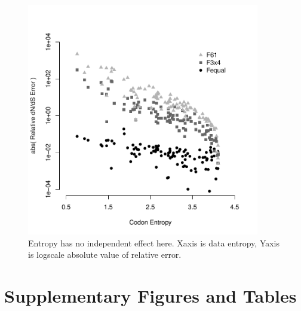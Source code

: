 \documentclass[11pt]{article}
\begin{document}
\bigskip
\begin{figure}[H]
\centerline{\includegraphics[width=4in]{figures/entropy_error_nobias.pdf}}
\caption{\label{entropyerror_nobias} Entropy has no independent effect here. Xaxis is data entropy, Yaxis is logscale absolute value of relative error.}
\end{figure}



\clearpage
\newpage

\section*{Supplementary Figures and Tables}
\end{document}
